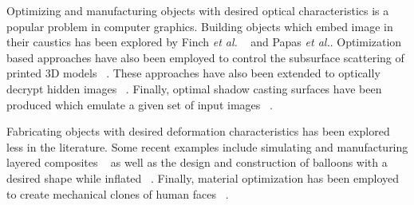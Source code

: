 \documentclass[annual]{acmsiggraph}
\begin{document}
Optimizing and manufacturing objects with desired optical characteristics is a popular problem in computer graphics. Building objects which embed image in their caustics has been explored by Finch \textit{et al.} ~ and Papas \textit{et al.}. Optimization based approaches have also been employed to control the subsurface scattering of printed 3D models ~\cite{Hasan:2010}. These approaches have also been extended to optically decrypt hidden images ~\cite{Papas:2012}. Finally, optimal shadow casting surfaces have been produced which emulate a given set of input images ~\cite{Bermano:2012}.

Fabricating objects with desired deformation characteristics has been explored less in the literature. Some recent examples include simulating and manufacturing layered composites ~\cite{Bickel:2010} as well as the design and construction of balloons with a desired shape while inflated ~\cite{sko:2012}. Finally, material optimization has been employed to create mechanical clones of human faces ~\cite{Bickel:2012}.
\end{document}
